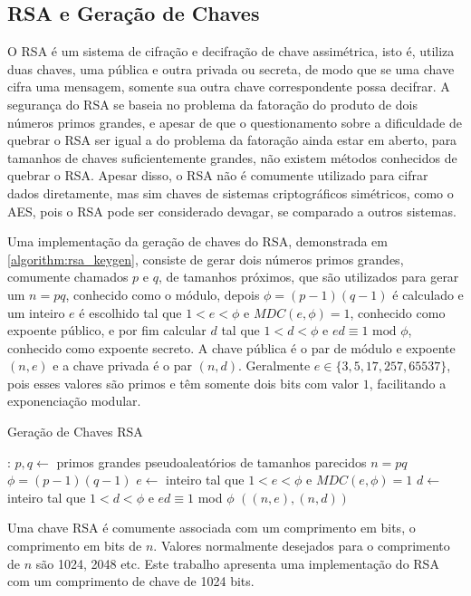 \documentclass{article}
\begin{document}
\subsection{RSA e Geração de Chaves}
\label{subsection:rsa}
O RSA é um sistema de cifração e decifração de chave assimétrica, isto é, utiliza duas chaves, uma
pública e outra privada ou secreta, de modo que se uma chave cifra uma mensagem, somente sua outra chave
correspondente possa decifrar. A segurança do RSA se baseia no problema da fatoração do produto de dois
números primos grandes, e apesar de que o questionamento sobre a dificuldade de quebrar o RSA ser igual
a do problema da fatoração ainda estar em aberto, para tamanhos de chaves suficientemente grandes, não
existem métodos conhecidos de quebrar o RSA. Apesar disso, o RSA não é comumente utilizado para cifrar
dados diretamente, mas sim chaves de sistemas criptográficos simétricos, como o AES, pois o RSA pode ser
considerado devagar, se comparado a outros sistemas.

Uma implementação da geração de chaves do RSA, demonstrada em \ref{algorithm:rsa_keygen}, consiste de gerar
dois números primos grandes, comumente chamados $p$ e $q$, de tamanhos próximos, que são utilizados
para gerar um $n = pq$, conhecido como o módulo, depois $\phi = (p - 1)(q - 1)$ é calculado e um inteiro
$e$ é escolhido tal que $1 < e < \phi$ e $MDC(e, \phi) = 1$, conhecido como expoente público, e por fim
calcular $d$ tal que $1 < d < \phi$ e $ed \equiv 1 \text{ mod } \phi$, conhecido como expoente secreto.
A chave pública é o par de módulo e expoente $(n, e)$ e a chave privada é o par $(n, d)$. Geralmente
$e \in \{3, 5, 17, 257, 65537\}$, pois esses valores são primos e têm somente dois bits com valor $1$,
facilitando a exponenciação modular.

\begin{algorithm}
	\caption{Geração de Chaves RSA}
	\label{algorithm:rsa_keygen}
	\begin{algorithmic}
		:
		\State $p, q \leftarrow$ primos grandes pseudoaleatórios de tamanhos parecidos
		\State $n = pq$
		\State $\phi = (p - 1)(q - 1)$
		\State $e \leftarrow$ inteiro tal que $1 < e < \phi$ e $MDC(e, \phi) = 1$
		\State $d \leftarrow$ inteiro tal que $1 < d < \phi$ e $ed \equiv 1$ mod $\phi$
		\State\Return $((n, e), (n, d))$
		\EndFunction
	\end{algorithmic}
\end{algorithm}

Uma chave RSA é comumente associada com um comprimento em bits, o comprimento em bits de $n$. Valores
normalmente desejados para o comprimento de $n$ são 1024, 2048 etc. Este trabalho apresenta uma
implementação do RSA com um comprimento de chave de 1024 bits.
\end{document}
